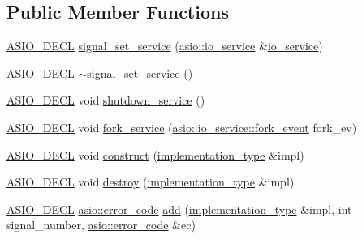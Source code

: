 \subsection*{Public Member Functions}
\begin{DoxyCompactItemize}
\item 
\hyperlink{config_8hpp_ab54d01ea04afeb9a8b39cfac467656b7}{A\+S\+I\+O\+\_\+\+D\+E\+C\+L} \hyperlink{classasio_1_1detail_1_1signal__set__service_a18f8907dffb01f5300e07444e4524cd5}{signal\+\_\+set\+\_\+service} (\hyperlink{classasio_1_1io__service}{asio\+::io\+\_\+service} \&\hyperlink{classasio_1_1io__service}{io\+\_\+service})
\item 
\hyperlink{config_8hpp_ab54d01ea04afeb9a8b39cfac467656b7}{A\+S\+I\+O\+\_\+\+D\+E\+C\+L} \hyperlink{classasio_1_1detail_1_1signal__set__service_ae9a444efa033009b4c83de8f6c4354c9}{$\sim$signal\+\_\+set\+\_\+service} ()
\item 
\hyperlink{config_8hpp_ab54d01ea04afeb9a8b39cfac467656b7}{A\+S\+I\+O\+\_\+\+D\+E\+C\+L} void \hyperlink{classasio_1_1detail_1_1signal__set__service_a17983f7c1370305fcf34baf9d3393656}{shutdown\+\_\+service} ()
\item 
\hyperlink{config_8hpp_ab54d01ea04afeb9a8b39cfac467656b7}{A\+S\+I\+O\+\_\+\+D\+E\+C\+L} void \hyperlink{classasio_1_1detail_1_1signal__set__service_aa2c07d110350f8cf6cc021b49d2cca83}{fork\+\_\+service} (\hyperlink{classasio_1_1io__service_a45f084ae64e601f7ead3f891d5ed0fc6}{asio\+::io\+\_\+service\+::fork\+\_\+event} fork\+\_\+ev)
\item 
\hyperlink{config_8hpp_ab54d01ea04afeb9a8b39cfac467656b7}{A\+S\+I\+O\+\_\+\+D\+E\+C\+L} void \hyperlink{classasio_1_1detail_1_1signal__set__service_a9638dd931ac8cf139447db5c48a032d6}{construct} (\hyperlink{classasio_1_1detail_1_1signal__set__service_1_1implementation__type}{implementation\+\_\+type} \&impl)
\item 
\hyperlink{config_8hpp_ab54d01ea04afeb9a8b39cfac467656b7}{A\+S\+I\+O\+\_\+\+D\+E\+C\+L} void \hyperlink{classasio_1_1detail_1_1signal__set__service_a0b0ecb37b6d3686758d867c85fa04ba4}{destroy} (\hyperlink{classasio_1_1detail_1_1signal__set__service_1_1implementation__type}{implementation\+\_\+type} \&impl)
\item 
\hyperlink{config_8hpp_ab54d01ea04afeb9a8b39cfac467656b7}{A\+S\+I\+O\+\_\+\+D\+E\+C\+L} \hyperlink{classasio_1_1error__code}{asio\+::error\+\_\+code} \hyperlink{classasio_1_1detail_1_1signal__set__service_a3017e91b91e68a86c4f3162c1232c50f}{add} (\hyperlink{classasio_1_1detail_1_1signal__set__service_1_1implementation__type}{implementation\+\_\+type} \&impl, int signal\+\_\+number, \hyperlink{classasio_1_1error__code}{asio\+::error\+\_\+code} \&ec)

\end{DoxyCompactItemize}
